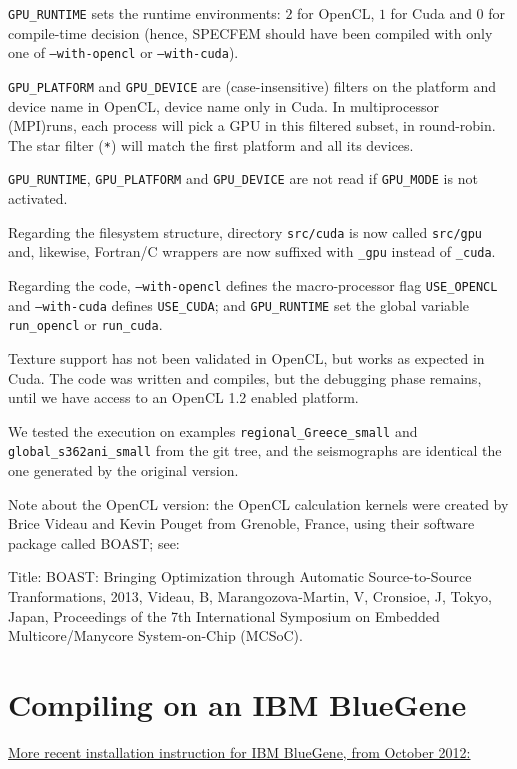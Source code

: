 \documentclass[oneside,english]{book}
\begin{document}
\texttt{GPU\_RUNTIME} sets the runtime environments: $2$ for OpenCL,
$1$ for Cuda and 0 for compile-time decision (hence, SPECFEM should
have been compiled with only one of \texttt{--with-opencl} or \texttt{--with-cuda}).

\texttt{GPU\_PLATFORM} and \texttt{GPU\_DEVICE} are (case-insensitive)
filters on the platform and device name in OpenCL, device name only in
Cuda. In multiprocessor (MPI)runs, each process will pick a GPU in
this filtered subset, in round-robin. The star filter (\texttt{*})
will match the first platform and all its devices.

\texttt{GPU\_RUNTIME}, \texttt{GPU\_PLATFORM} and \texttt{GPU\_DEVICE}
are not read if \texttt{GPU\_MODE} is not activated.

Regarding the filesystem structure, directory \texttt{src/cuda}  is now called
\texttt{src/gpu} and, likewise, Fortran/C wrappers are now suffixed
with \texttt{\_gpu} instead of \texttt{\_cuda}.

Regarding the code, \texttt{--with-opencl} defines the
macro-processor flag \texttt{USE\_OPENCL} and \texttt{--with-cuda}
defines \texttt{USE\_CUDA}; and \texttt{GPU\_RUNTIME} set the global
variable \texttt{run\_opencl} or \texttt{run\_cuda}.

Texture support has not been validated in OpenCL, but works as
expected in Cuda. The code was written and compiles, but the debugging
phase remains, until we have access to an OpenCL 1.2 enabled platform.

We tested the execution on examples \texttt{regional\_Greece\_small}
and \texttt{global\_s362ani\_small} from the git tree, and the
seismographs are identical the one generated by the original version.

Note about the OpenCL version: the OpenCL calculation kernels were
created by Brice Videau and Kevin Pouget from Grenoble, France, using
their software package called BOAST; see:

Title:  BOAST: Bringing Optimization through Automatic Source-to-Source Tranformations,
2013,
Videau, B, Marangozova-Martin, V, Cronsioe, J,
Tokyo, Japan,
Proceedings of the 7th International Symposium on Embedded Multicore/Manycore System-on-Chip (MCSoC).

\section{Compiling on an IBM BlueGene}

\underline{More recent installation instruction for IBM BlueGene, from October 2012:}\\
\end{document}

